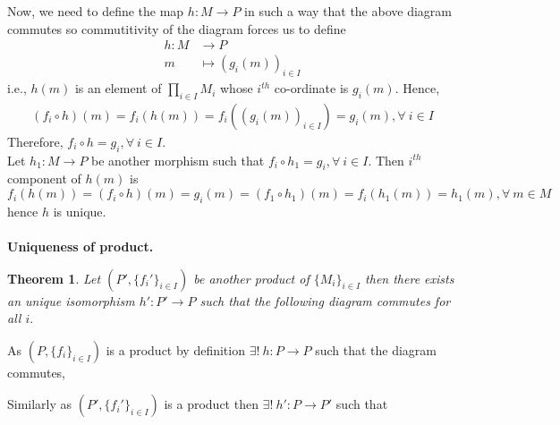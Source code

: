\documentclass[11pt]{amsart}
\newtheorem{theorem}{Theorem}[section]
\begin{document}
Now, we need to define the map $h:M\to P$ in such a way that the above diagram commutes so commutitivity of the diagram forces us to define \begin{align*}
h:M&\to P\\
m&\mapsto (g_i(m))_{i\in I}
\end{align*}
i.e., $h(m)$ is an element of $\displaystyle\prod_{i\in I} M_i$ whose $i^{th}$ co-ordinate is $g_i(m).$ Hence, \begin{align*}
(f_i\circ h)(m)=f_i(h(m))=f_i((g_i(m))_{i\in I})=g_i(m),\forall~i\in I
\end{align*}
Therefore, $f_i\circ h=g_i,\forall~i\in I.$ \\
Let $h_1: M\to P$ be another morphism such that $f_i\circ h_1=g_i,\forall~i\in I.$ Then $i^{th}$ component of $h(m)$ is $f_i(h(m))=(f_i\circ h)(m)=g_i(m)=(f_1\circ h_1)(m)=f_i(h_1(m))=h_1(m),\forall~m\in M$ hence $h$ is unique.\\\\
\textbf{Uniqueness of product.} \begin{theorem}
Let $(P',\{f_i'\}_{i\in I})$ be another product of $\{M_i\}_{i\in I}$ then there exists an unique isomorphism $h':P'\to P$ such that the following diagram commutes for all $i.$ \begin{center}
\end{center}
\end{theorem}
\proof As $(P,\{f_i\}_{i\in I})$ is a product by definition $\exists! ~h:P\to P$ such that the diagram commutes,\begin{center}
\end{center}
Similarly as $(P',\{f_i'\}_{i\in I})$ is a product then $\exists!~h':P\to P'$ such that \begin{center}
\end{center}
\end{document}
